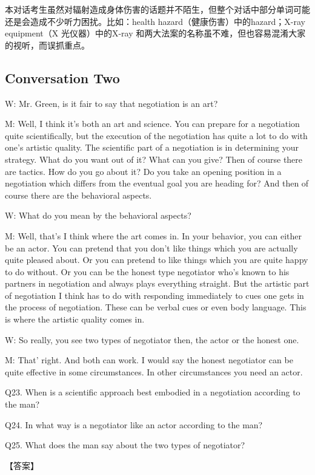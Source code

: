 \documentclass[UTF8,11pt]{ctexart}
\begin{document}
本对话考生虽然对辐射造成身体伤害的话题并不陌生，但整个对话中部分单词可能还是会造成不少听力困扰。比如：health hazard（健康伤害）中的hazard；X-ray equipment（X 光仪器）中的X-ray 和两大法案的名称虽不难，但也容易混淆大家的视听，而误抓重点。


\subsection*{Conversation Two}


W: Mr. Green, is it fair to say that negotiation is an art?


M: Well, I think it’s both an art and science. You can prepare for a negotiation quite scientifically, but the execution of the negotiation has quite a lot to do with one’s artistic quality. The scientific part of a negotiation is in determining your strategy. What do you want out of it? What can you give? Then of course there are tactics. How do you go about it? Do you take an opening position in a negotiation which differs from the eventual goal you are heading for? And then of course there are the behavioral aspects.


W: What do you mean by the behavioral aspects?


M: Well, that’s I think where the art comes in. In your behavior, you can either be an actor. You can pretend that you don’t like things which you are actually quite pleased about. Or you can pretend to like things which you are quite happy to do without. Or you can be the honest type negotiator who’s known to his partners in negotiation and always plays everything straight. But the artistic part of negotiation I think has to do with responding immediately to cues one gets in the process of negotiation. These can be verbal cues or even body language. This is where the artistic quality comes in.


W: So really, you see two types of negotiator then, the actor or the honest one.


M: That’ right. And both can work. I would say the honest negotiator can be quite effective in some circumstances. In other circumstances you need an actor.


Q23. When is a scientific approach best embodied in a negotiation according to the man?


Q24. In what way is a negotiator like an actor according to the man?


Q25. What does the man say about the two types of negotiator?


【答案】
\end{document}
